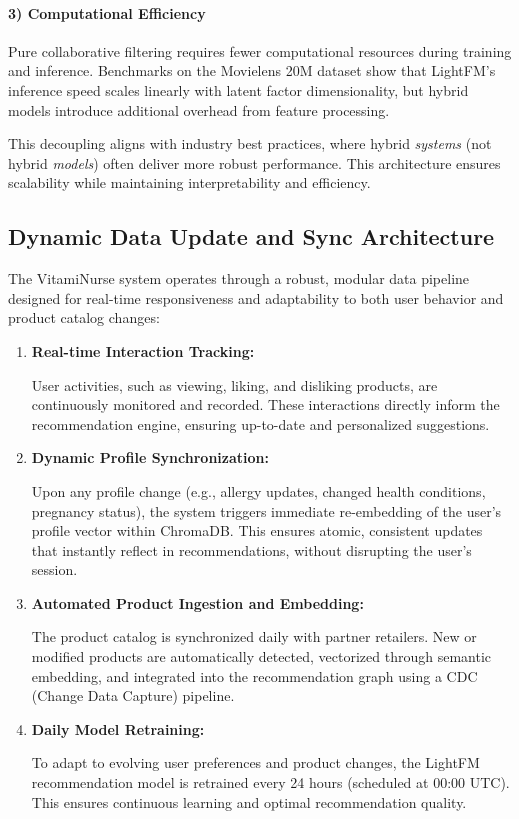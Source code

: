 \paragraph{3) Computational Efficiency}

Pure collaborative filtering requires fewer
computational resources during training and inference. Benchmarks on
the Movielens 20M dataset show that LightFM’s inference speed scales
linearly with latent factor dimensionality, but hybrid models introduce
additional overhead from feature processing.

This decoupling aligns with industry best practices, where hybrid \textit{systems} (not hybrid \textit{models}) often deliver more robust performance. This
architecture ensures scalability while maintaining interpretability and
efficiency.
\subsection{Dynamic Data Update and Sync Architecture}
The VitamiNurse system operates through a robust, modular data
pipeline designed for real-time responsiveness and adaptability to both
user behavior and product catalog changes:
\begin{enumerate}
\item \textbf{ Real-time Interaction Tracking:} 

User activities, such as viewing, liking, and disliking products, are continuously monitored and
recorded. These interactions directly inform the recommendation
engine, ensuring up-to-date and personalized suggestions.
\item \textbf{Dynamic Profile Synchronization:} 

Upon any profile change
(e.g., allergy updates, changed health conditions, pregnancy status),
the system triggers immediate re-embedding of the user’s profile
vector within ChromaDB. This ensures atomic, consistent updates
that instantly reflect in recommendations, without disrupting the
user’s session.
\item \textbf{ Automated Product Ingestion and Embedding:} 

The product
catalog is synchronized daily with partner retailers. New or modified
products are automatically detected, vectorized through semantic
embedding, and integrated into the recommendation graph using a
CDC (Change Data Capture) pipeline.

\item \textbf{Daily Model Retraining:}

To adapt to evolving user preferences
and product changes, the LightFM recommendation model is retrained every 24 hours (scheduled at 00:00 UTC). This ensures
continuous learning and optimal recommendation quality.
\end{enumerate}

